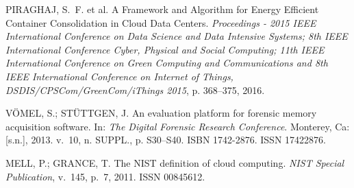 \documentclass[conference]{IEEEtran}
\begin{document}
\begin{thebibliography}{1}
{PIRAGHAJ, S.~F. et al. {A Framework and Algorithm for Energy Efficient
  Container Consolidation in Cloud Data Centers}.
\emph{Proceedings - 2015 IEEE International Conference on Data Science and Data
  Intensive Systems; 8th IEEE International Conference Cyber, Physical and
  Social Computing; 11th IEEE International Conference on Green Computing and
  Communications and 8th IEEE International Conference on Internet of Things,
  DSDIS/CPSCom/GreenCom/iThings 2015}, p. 368--375, 2016.}
  
{V{\"{O}}MEL, S.; ST{\"{U}}TTGEN, J. {An evaluation platform for forensic
  memory acquisition software}. In:  \emph{The Digital Forensic Research
  Conference}. Monterey, Ca: [s.n.], 2013. v.~10, n. SUPPL., p. S30--S40.
ISBN 1742-2876.
ISSN 17422876.}

{MELL, P.; GRANCE, T. {The NIST definition of cloud computing}.
\emph{NIST Special Publication}, v.~145, p.~7, 2011. ISSN 00845612.}

\end{thebibliography}

\end{document}
